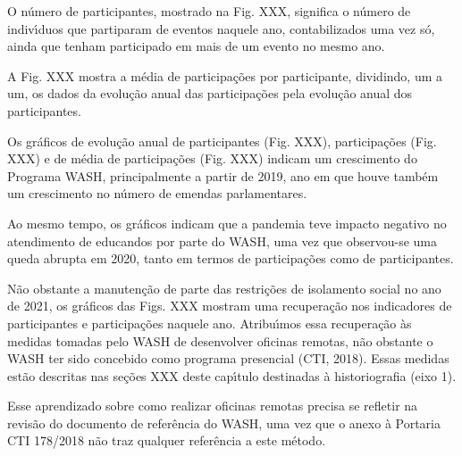 \documentclass[
12pt,		%
openright,	%
twoside,  %
a4paper,			%
chapter=TITLE,		%
english,			%
french,				%
spanish,			%
brazil				%
]{USPSC-classe/USPSC}
\begin{document}
O n\'umero de participantes, mostrado na Fig. XXX, significa o n\'umero de indiv\'{\i}duos que partiparam de eventos naquele ano, contabilizados uma vez s\'o, ainda que tenham participado em mais de um evento no mesmo ano.










A Fig. XXX mostra a m\'edia de participa\c{c}\~oes por participante, dividindo, um a um, os dados da evolu\c{c}\~ao anual das participa\c{c}\~oes pela evolu\c{c}\~ao anual dos participantes.










Os gr\'aficos de evolu\c{c}\~ao anual de participantes (Fig. XXX), participa\c{c}\~oes (Fig. XXX) e de m\'edia de participa\c{c}\~oes (Fig. XXX) indicam um crescimento do Programa WASH, principalmente a partir de 2019, ano em que houve tamb\'em um crescimento no n\'umero de emendas parlamentares.










Ao mesmo tempo, os gr\'aficos indicam que a pandemia teve impacto negativo no atendimento de educandos por parte do WASH, uma vez que observou-se uma queda abrupta em 2020, tanto em termos de participa\c{c}\~oes como de participantes.










N\~ao obstante a manuten\c{c}\~ao de parte das restri\c{c}\~oes de isolamento social no ano de 2021, os gr\'aficos das Figs. XXX mostram uma recupera\c{c}\~ao nos indicadores de participantes e participa\c{c}\~oes naquele ano. Atribu\'{\i}mos essa recupera\c{c}\~ao \`as medidas tomadas pelo WASH de desenvolver oficinas remotas, n\~ao obstante o WASH ter sido concebido como programa presencial  (CTI, 2018). Essas medidas est\~ao descritas nas se\c{c}\~oes XXX deste cap\'{\i}tulo destinadas \`a historiografia (eixo 1).










Esse aprendizado sobre como realizar oficinas remotas precisa se refletir na revis\~ao do documento de refer\^encia do WASH, uma vez que o anexo \`a Portaria CTI 178/2018 n\~ao traz qualquer refer\^encia a este m\'etodo.
\end{document}
